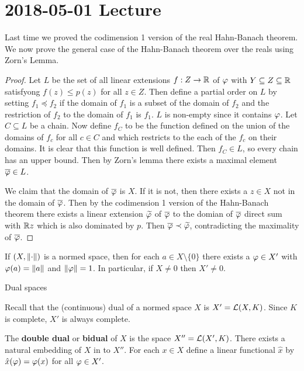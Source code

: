 \section{2018-05-01 Lecture}

Last time we proved the codimension 1 version of the real Hahn-Banach theorem.
We now prove the general case of the Hahn-Banach theorem over the reals using Zorn's Lemma.

\begin{proof}
  Let $L$ be the set of all linear extensions $f:Z \to \mathbb{R}$ of $\varphi$ with $Y \subseteq Z \subseteq \mathbb{R}$ satisfyong $f(z) \leq p(z)$ for all $z \in Z$.
  Then define a partial order on $L$ by setting $f_1 \preceq f_2$ if the domain of $f_1$ is a subset of the domain of $f_2$ and the restriction of $f_2$ to the domain of $f_1$ is $f_1$.
  $L$ is non-empty since it contains $\varphi$.
  Let $C \subseteq L$ be a chain.
  Now define $f_C$ to be the function defined on the union of the domains of $f_c$ for all $c \in C$ and which restricts to the each of the $f_c$ on their domains.
  It is clear that this function is well defined.
  Then $f_C \in L$, so every chain has an upper bound.
  Then by Zorn's lemma there exists a maximal element $\overline{\varphi} \in L$.

  We claim that the domain of $\overline{\varphi}$ is $X$.
  If it is not, then there exists a $z \in X$ not in the domain of $\overline{\varphi}$.
  Then by the codimension 1 version of the Hahn-Banach theorem there exists a linear extension $\widetilde{\varphi}$ of $\overline{\varphi}$ to the domian of $\overline{\varphi}$ direct sum with $\mathbb{R} z$ which is also dominated by $p$.
  Then $\overline{\varphi} \prec \widetilde{\varphi}$, contradicting the maximality of $\overline{\varphi}$.
\end{proof}

\begin{cor}
  If $(X,\left\lVert \cdot \right\rVert)$ is a normed space, then for each $a \in X \setminus \{0\}$ there exists a $\varphi \in X'$ with $\varphi(a)=\left\lVert a \right\rVert$ and $\left\lVert \varphi \right\rVert=1$.
  In particular, if $X \neq 0$ then $X' \neq 0$.
\end{cor}

Dual spaces
\begin{rmk}
  Recall that the (continuous) dual of a normed space $X$ is $X'=\mathcal{L}(X,K)$.
  Since $K$ is complete, $X'$ is always complete.
\end{rmk}

\begin{defn}
  The \textbf{double dual} or \textbf{bidual} of $X$ is the space $X''=\mathcal{L}(X',K)$.
  There exists a natural embedding of $X$ in to $X''$.
  For each $x \in X$ define a linear functional $\hat x$ by $\hat x(\varphi) = \varphi(x)$ for all $\varphi \in X'$.
\end{defn}


